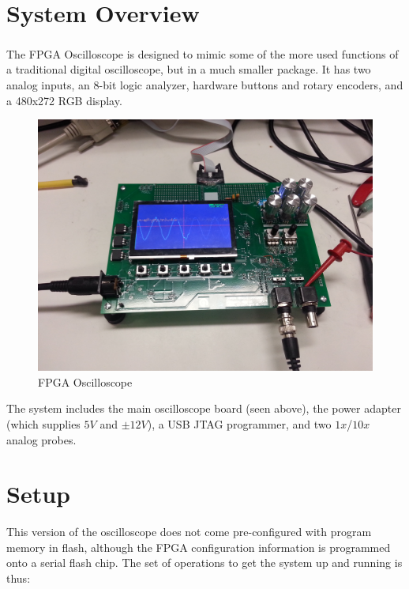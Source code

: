 \section{System Overview}
The FPGA Oscilloscope \textsuperscript{\textregistered} is designed to mimic some of the more used functions of a traditional digital oscilloscope, but in a much smaller package. It has two analog inputs, an 8-bit logic analyzer, hardware buttons and rotary encoders, and a 480x272 RGB display.

\begin{figure}[ht!]
    \centering
    \includegraphics[width=6in]{images/osc_full.jpg}
		\caption{FPGA Oscilloscope}
\end{figure}

The system includes the main oscilloscope board (seen above), the power adapter (which supplies $5V$ and $\pm 12V$), a USB JTAG programmer, and two $1x$/$10x$ analog probes.

\section{Setup}
This version of the oscilloscope does not come pre-configured with program memory in flash, although the FPGA configuration information is programmed onto a serial flash chip. The set of operations to get the system up and running is thus:

